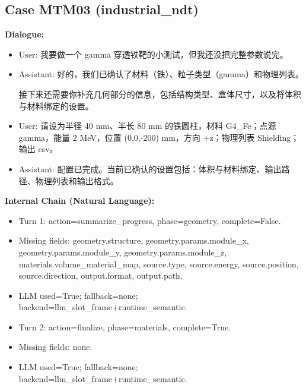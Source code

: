 \documentclass[11pt]{ctexart}
\begin{document}
\subsection{Case MTM03 (industrial\_ndt)}
\textbf{Dialogue:}
\begin{itemize}
\item User: 我要做一个 gamma 穿透铁靶的小测试，但我还没把完整参数说完。
\item Assistant: 好的，我们已确认了材料（铁）、粒子类型（gamma）和物理列表。

接下来还需要你补充几何部分的信息，包括结构类型、盒体尺寸，以及将体积与材料绑定的设置。
\item User: 请设为半径 40 mm、半长 80 mm 的铁圆柱，材料 G4\_Fe；点源 gamma，能量 2 MeV，位置 (0,0,-200) mm，方向 +z；物理列表 Shielding；输出 csv。
\item Assistant: 配置已完成。当前已确认的设置包括：体积与材料绑定、输出路径、物理列表和输出格式。
\end{itemize}
\textbf{Internal Chain (Natural Language):}
\begin{itemize}
\item Turn 1: action=summarize\_progress, phase=geometry, complete=False.
\item Missing fields: geometry.structure, geometry.params.module\_x, geometry.params.module\_y, geometry.params.module\_z, materials.volume\_material\_map, source.type, source.energy, source.position, source.direction, output.format, output.path.
\item LLM used=True; fallback=none; backend=llm\_slot\_frame+runtime\_semantic.
\item Turn 2: action=finalize, phase=materials, complete=True.
\item Missing fields: none.
\item LLM used=True; fallback=none; backend=llm\_slot\_frame+runtime\_semantic.
\end{itemize}
\end{document}
